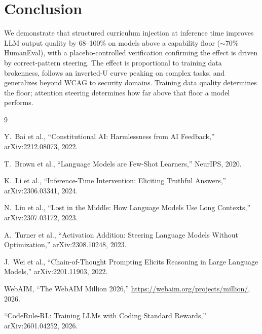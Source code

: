 \documentclass{article}
\begin{document}
\section{Conclusion}

We demonstrate that structured curriculum injection at inference time improves
LLM output quality by 68--100\% on models above a capability floor ($\sim$70\%
HumanEval), with a placebo-controlled verification confirming the effect is
driven by correct-pattern steering. The effect is proportional to training data
brokenness, follows an inverted-U curve peaking on complex tasks, and
generalizes beyond WCAG to security domains. Training data quality determines
the floor; attention steering determines how far above that floor a model
performs.


\begin{thebibliography}{9}

Y.~Bai et al., ``Constitutional AI: Harmlessness from AI Feedback,''
arXiv:2212.08073, 2022.

T.~Brown et al., ``Language Models are Few-Shot Learners,'' NeurIPS, 2020.

K.~Li et al., ``Inference-Time Intervention: Eliciting Truthful Answers,''
arXiv:2306.03341, 2024.

N.~Liu et al., ``Lost in the Middle: How Language Models Use Long Contexts,''
arXiv:2307.03172, 2023.

A.~Turner et al., ``Activation Addition: Steering Language Models Without
Optimization,'' arXiv:2308.10248, 2023.

J.~Wei et al., ``Chain-of-Thought Prompting Elicits Reasoning in Large
Language Models,'' arXiv:2201.11903, 2022.

WebAIM, ``The WebAIM Million 2026,''
\url{https://webaim.org/projects/million/}, 2026.

``CodeRule-RL: Training LLMs with Coding Standard Rewards,''
arXiv:2601.04252, 2026.

\end{thebibliography}
\end{document}
